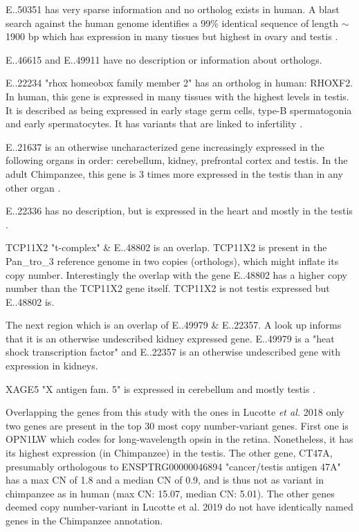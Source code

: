 E..50351 has very sparse information and no ortholog exists in human. A blast search against the human genome identifies a 99\% identical sequence of length $\sim$ 1900 bp which has expression in many tissues but highest in ovary and testis \cite{ensembl}. 

E..46615 and E..49911 have no description or information about orthologs.

E..22234 "rhox homeobox family member 2" has an ortholog in human: RHOXF2. In human, this gene is expressed in many tissues with the highest levels in testis. It is described as being expressed in early stage germ cells, type-B spermatogonia and early spermatocytes. It has variants that are linked to infertility \cite{10.1093/hmg/ddw313}.

E..21637 is an otherwise uncharacterized gene increasingly expressed in the following organs in order: cerebellum, kidney, prefrontal cortex and testis. In the adult Chimpanzee, this gene is 3 times more expressed in the testis than in any other organ \cite{bgee_}.

E..22336 has no description, but is expressed in the heart and mostly in the testis \cite{bgee_}.

TCP11X2 "t-complex" & E..48802 is an overlap. TCP11X2 is present in the Pan\_tro\_3 reference genome in two copies (orthologs), which might inflate its copy number. Interestingly the overlap with the gene E..48802 has a higher copy number than the TCP11X2 gene itself. TCP11X2 is not testis expressed \cite{ensembl} but E..48802 is.

The next region which is an overlap of E..49979 & E..22357. A look up informs that it is an otherwise undescribed kidney expressed gene. E..49979 is a "heat shock transcription factor" and E..22357 is an otherwise undescribed gene with expression in kidneys.

XAGE5 "X antigen fam. 5" is expressed in cerebellum and mostly testis \cite{bgee_}.

Overlapping the genes from this study with the ones in Lucotte \textit{et al.} 2018 \cite{Lucotte907} only two genes are present in the top 30 most copy number-variant genes. First one is OPN1LW which codes for long-wavelength opsin in the retina. Nonetheless, it has its highest expression (in Chimpanzee) in the testis\cite{bgee_}. The other gene, CT47A, presumably orthologous to ENSPTRG00000046894 "cancer/testis antigen 47A" has a max CN of 1.8 and a median CN of 0.9, and is thus not as variant in chimpanzee as in human (max CN: 15.07, median CN: 5.01). The other genes deemed copy number-variant in Lucotte et al. 2019 do not have identically named genes in the Chimpanzee annotation.


